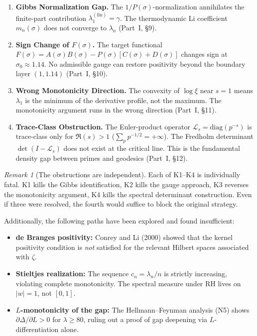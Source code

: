 \documentclass[12pt,a4paper]{article}
\theoremstyle{definition}
\theoremstyle{remark}
\newtheorem{remark}[theorem]{Remark}
\begin{document}
\begin{enumerate}[label=\textbf{K\arabic*},leftmargin=3em]
  \item \textbf{Gibbs Normalization Gap.} The $1/P(\sigma)$-normalization annihilates the finite-part contribution $\lambda_1^{(\mathrm{fin})} = \gamma$. The thermodynamic Li coefficient $m_n(\sigma)$ does not converge to $\lambda_n$ (Part~I, \S9).

  \item \textbf{Sign Change of $F(\sigma)$.} The target functional $F(\sigma) = A(\sigma)B(\sigma) - P(\sigma)[C(\sigma) + D(\sigma)]$ changes sign at $\sigma_0 \approx 1.14$. No admissible gauge can restore positivity beyond the boundary layer $(1, 1.14)$ (Part~I, \S10).

  \item \textbf{Wrong Monotonicity Direction.} The convexity of $\log\xi$ near $s = 1$ means $\lambda_1$ is the minimum of the derivative profile, not the maximum. The monotonicity argument runs in the wrong direction (Part~I, \S11).

  \item \textbf{Trace-Class Obstruction.} The Euler-product operator $\mathcal{L}_s = \mathrm{diag}(p^{-s})$ is trace-class only for $\Re(s) > 1$ ($\sum_p p^{-1/2} = +\infty$). The Fredholm determinant $\det(I - \mathcal{L}_s)$ does not exist at the critical line. This is the fundamental density gap between primes and geodesics (Part~I, \S12).
\end{enumerate}

\begin{remark}[The obstructions are independent]
Each of K1--K4 is individually fatal. K1 kills the Gibbs identification, K2 kills the gauge approach, K3 reverses the monotonicity argument, K4 kills the spectral determinant construction. Even if three were resolved, the fourth would suffice to block the original strategy.
\end{remark}

Additionally, the following paths have been explored and found insufficient:
\begin{itemize}
  \item \textbf{de Branges positivity:} Conrey and Li (2000) showed that the kernel positivity condition is \emph{not} satisfied for the relevant Hilbert spaces associated with $\zeta$.
  \item \textbf{Stieltjes realization:} The sequence $c_n = \lambda_n/n$ is strictly increasing, violating complete monotonicity. The spectral measure under RH lives on $|w| = 1$, not $[0,1]$.
  \item \textbf{$L$-monotonicity of the gap:} The Hellmann--Feynman analysis (N5) shows $\partial\Delta/\partial L > 0$ for $\lambda \geq 80$, ruling out a proof of gap deepening via $L$-differentiation alone.
\end{itemize}
\end{document}
